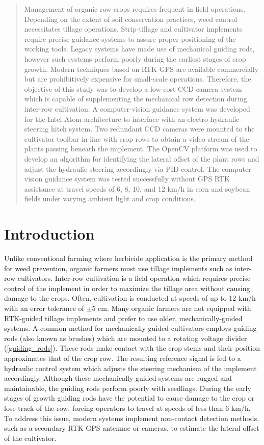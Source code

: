 \begin{abstract}
Management of organic row crops requires frequent in-field
operations. Depending on the extent of soil conservation practices, 
weed control necessitates tillage operations. Strip-tillage and
cultivator implements require precise guidance systems to
assure proper positioning of the working tools. Legacy systems have
made use of mechanical guiding rods, however such
systems perform poorly during the earliest stages of crop growth.
Modern techniques based on RTK GPS are available commercially but are
prohibitively expensive for small-scale operations.
Therefore, the objective of this study was to develop a low-cost CCD 
camera system which is capable of supplementing the mechanical row detection during inter-row cultivation.
A computer-vision guidance system was developed for the Intel Atom 
architecture to interface with an electro-hydraulic steering hitch system.
Two redundant CCD cameras were mounted to the cultivator toolbar
in-line with crop rows to obtain a video stream of the plants passing beneath the implement.
The OpenCV platform was used to develop an algorithm for identifying
the lateral offset of the plant rows and adjust the hydraulic steering
accordingly via PID control. The computer-vision guidance system was
tested successfully without GPS RTK assistance at travel speeds of 6,
8, 10, and 12 km/h in corn and soybean fields under varying ambient
light and crop conditions.
\end{abstract}

\section{Introduction}
Unlike conventional farming where herbicide application is the primary
method for weed prevention, organic farmers must use tillage
implements such as inter-row cultivators. Inter-row cultivation is a
field operation which requires precise control of the implement in
order to maximize the tillage area without causing damage to the
crops. Often, cultivation is conducted at speeds of up to 12 km/h with
an error tolerance of $\pm$5 cm. Many organic farmers are not equipped
with RTK-guided tillage implements and prefer to use older,
mechanically-guided systems. A common method for mechanically-guided
cultivators employs guiding rods (also known as
brushes) which are mounted to a rotating voltage divider
(\ref{guiding_rods}). These rods make contact with the crop stems and their
position approximates that of the crop row. The resulting reference
signal is fed to a hydraulic control system which adjusts the steering
mechanism of the implement accordingly. Although these
mechanically-guided systems are rugged and maintainable, the guiding
rods perform poorly with seedlings. During the early stages of growth
guiding rods have the potential to cause damage to the crop or lose
track of the row, forcing operators to travel at speeds of less than 6
km/h. To address this issue, modern systems implement non-contact
detection methods, such as a secondary RTK GPS antennae or cameras, to
estimate the lateral offset of the cultivator.

